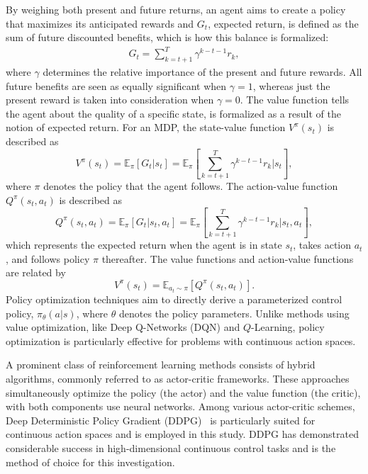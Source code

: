 \documentclass[conference]{IEEEtran}
\begin{document}
By weighing both present and future returns, an agent aims to create a policy that maximizes its anticipated rewards and \( G_t \), expected return, is defined as the sum of future discounted benefits, which is how this balance is formalized:
\begin{align}
    G_t = \sum_{k=t+1}^{T} \gamma^{k-t-1} r_k,
\end{align}
where \( \gamma\) determines the relative importance of the present and future rewards.
All future benefits are seen as equally significant when \( \gamma = 1 \), whereas just the present reward is taken into consideration when \( \gamma = 0 \).
The value function tells the agent about the quality of a specific state, is formalized as a result of the notion of expected return.
For an MDP, the state-value function \( V^\pi(s_t) \) is described as
\begin{equation}
	V^\pi(s_t) = \mathbb{E}_\pi \left[ G_t | s_t \right] = \mathbb{E}_\pi \left[ \sum_{k=t+1}^{T} \gamma^{k-t-1} r_k | s_t \right],
\end{equation}
where \( \pi \) denotes the policy that the agent follows. The action-value function \( Q^\pi(s_t, a_t) \) is described as
\begin{equation}
	Q^\pi(s_t, a_t) = \mathbb{E}_\pi \left[ G_t | s_t, a_t \right] = \mathbb{E}_\pi \left[ \sum_{k=t+1}^{T} \gamma^{k-t-1} r_k | s_t, a_t \right],
\end{equation}
which represents the expected return when the agent is in state \( s_t \), takes action \( a_t \), and follows policy \( \pi \) thereafter. The value functions and action-value functions are related by
\begin{equation}
	V^\pi(s_t) = \mathbb{E}_{a_t \sim \pi} \left[ Q^\pi(s_t, a_t) \right].
\end{equation}
Policy optimization techniques aim to directly derive a parameterized control policy, \( \pi_\theta(a | s) \), where \( \theta \) denotes the policy parameters.
 Unlike methods using value optimization, like Deep Q-Networks (DQN) and \( Q \)-Learning, policy optimization is particularly effective for problems with continuous action spaces.

A prominent class of reinforcement learning methods consists of hybrid algorithms, commonly referred to as actor-critic frameworks. These approaches simultaneously optimize the policy (the actor) and the value function (the critic), with both components use neural networks. Among various actor-critic schemes, Deep Deterministic Policy Gradient (DDPG)~\cite{DDPG} is particularly suited for continuous action spaces and is employed in this study. DDPG has demonstrated considerable success in high-dimensional continuous control tasks and is the method of choice for this investigation.
\end{document}
